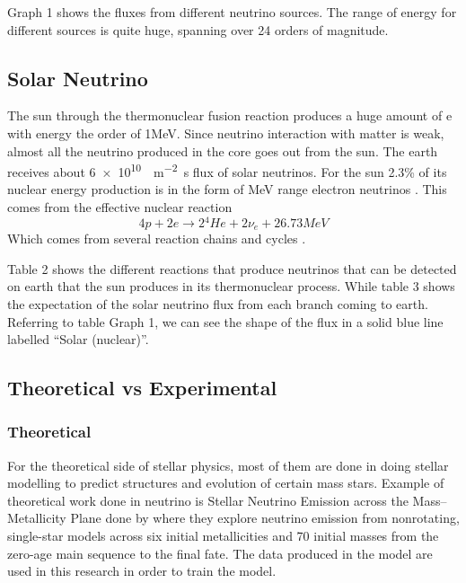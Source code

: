 Graph 1  shows the fluxes from different neutrino sources. The range of energy for different sources is quite huge, spanning over 24 orders of magnitude. 

\subsection{Solar Neutrino}
The sun through the thermonuclear fusion reaction produces a huge amount of e with energy the order of 1MeV. Since neutrino interaction with matter is weak, almost all the neutrino produced in the core goes out from the sun. The earth receives about \SI{6e10}{\centi\per\meter\squared\second} flux of solar neutrinos. For the sun 2.3\% of its nuclear energy production is in the form of MeV range electron neutrinos . This comes from the effective nuclear reaction 
\begin{equation}
	4p+2e\rightarrow2{}^{4}He+2\nu{}_{e}+26.73MeV
\end{equation}
Which comes from several reaction chains and cycles .

Table 2  shows the different reactions that produce neutrinos that can be detected on earth that the sun produces in its thermonuclear process. While table 3  shows the expectation of the solar neutrino flux from each branch coming to earth. Referring to table Graph 1, we can see the shape of the flux in a solid blue line labelled ``Solar (nuclear)''.

\subsection{Theoretical vs Experimental}

\subsubsection{Theoretical}
For the theoretical side of stellar physics, most of them are done in doing stellar modelling to predict structures and evolution of certain mass stars. Example of theoretical work done in neutrino is Stellar Neutrino Emission across the Mass–Metallicity Plane done by  where they explore neutrino emission from nonrotating, single-star models across six initial metallicities and 70 initial masses from the zero-age main sequence to the final fate. The data produced in the model are used in this research in order to train the model.

